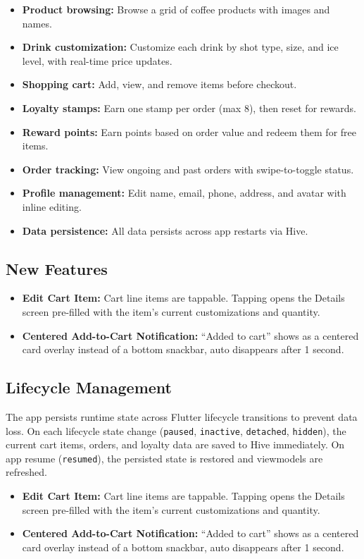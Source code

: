 \begin{itemize}[nosep]
  \item \textbf{Product browsing:} Browse a grid of coffee products with images and names.
  \item \textbf{Drink customization:} Customize each drink by shot type, size, and ice level, with real-time price updates.
  \item \textbf{Shopping cart:} Add, view, and remove items before checkout.
  \item \textbf{Loyalty stamps:} Earn one stamp per order (max 8), then reset for rewards.
  \item \textbf{Reward points:} Earn points based on order value and redeem them for free items.
  \item \textbf{Order tracking:} View ongoing and past orders with swipe-to-toggle status.
  \item \textbf{Profile management:} Edit name, email, phone, address, and avatar with inline editing.
  \item \textbf{Data persistence:} All data persists across app restarts via Hive.
\end{itemize}

\subsection{New Features}

\begin{itemize}[nosep]
  \item \textbf{Edit Cart Item:} Cart line items are tappable. Tapping opens the Details screen pre-filled with the item's current customizations and quantity.
  \item \textbf{Centered Add-to-Cart Notification:} ``Added to cart'' shows as a centered card overlay instead of a bottom snackbar, auto disappears after 1 second.
\end{itemize}

\subsection{Lifecycle Management}

The app persists runtime state across Flutter lifecycle transitions to prevent data loss. On each lifecycle state change (\texttt{paused}, \texttt{inactive}, \texttt{detached}, \texttt{hidden}), the current cart items, orders, and loyalty data are saved to Hive immediately. On app resume (\texttt{resumed}), the persisted state is restored and viewmodels are refreshed.

\begin{itemize}[nosep]
  \item \textbf{Edit Cart Item:} Cart line items are tappable. Tapping opens the Details screen pre-filled with the item's current customizations and quantity.
  \item \textbf{Centered Add-to-Cart Notification:} ``Added to cart'' shows as a centered card overlay instead of a bottom snackbar, auto disappears after 1 second.
\end{itemize}

